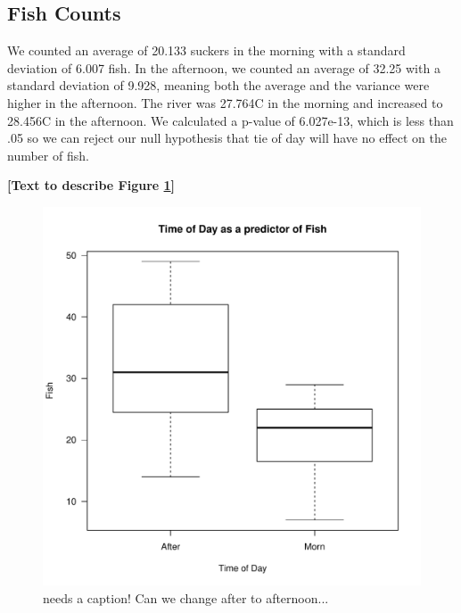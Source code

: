 \documentclass{article}\usepackage[]{graphicx}\usepackage[]{color}
\makeatletter
\def\maxwidth{ %
  \ifdim\Gin@nat@width>\linewidth
    \linewidth
  \else
    \Gin@nat@width
  \fi
}
\newenvironment{knitrout}{}{} %
\makeatother
\begin{document}
\subsection{Fish Counts}

We counted an average of 20.133 suckers in the morning with a standard deviation of 6.007 fish.  In the afternoon, we counted an average of 32.25 with a standard deviation of 9.928, meaning both the average and the variance were higher in the afternoon.  The river was 27.764\textdegree C in the morning and increased to 28.456\textdegree C in the afternoon.  We calculated a p-value of 6.027e-13, which is less than .05 so we can reject our null hypothesis that tie of day will have no effect on the number of fish.



\textbf{[Text to describe Figure \ref{fig:fishsection}]}

\begin{figure}[!ht]
\begin{knitrout}
\color{fgcolor}
\includegraphics[width=\maxwidth]{figure/unnamed-chunk-8-1} 

\end{knitrout}
\caption{needs a caption! Can we change after to afternoon...}
\label{fig:fishsection}
\end{figure}
\end{document}
